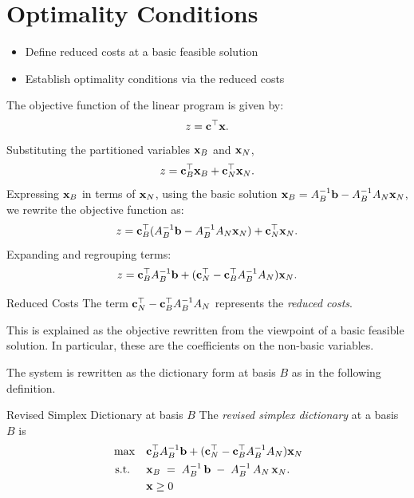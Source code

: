 \section{Optimality Conditions}
\label{sec:optimality-conditions}
\begin{outcome}
\begin{itemize}
\item Define reduced costs at a basic feasible solution
\item Establish optimality conditions via the reduced costs
\end{itemize}
\end{outcome}
The objective function of the linear program is given by:
    \[
    z = \mathbf{c}^\top \mathbf{x}.
    \]
    Substituting the partitioned variables \( \mathbf{x}_B \) and \( \mathbf{x}_N \),
    \[
    z =\mathbf{c}_B^\top \mathbf{x}_B +\mathbf{c}_N^\top \mathbf{x}_N.
    \]
    Expressing \( \mathbf{x}_B \) in terms of \( \mathbf{x}_N \), using the basic solution \( \mathbf{x}_B = A_B^{-1}\mathbf{b}- A_B^{-1} A_N \mathbf{x}_N \), we rewrite the objective function as:
    \begin{equation}
    z =\mathbf{c}_B^\top (A_B^{-1}\mathbf{b}- A_B^{-1} A_N \mathbf{x}_N) +\mathbf{c}_N^\top \mathbf{x}_N.
    \end{equation}
    Expanding and regrouping terms:
    \begin{equation}
    z =\mathbf{c}_B^\top A_B^{-1}\mathbf{b}+  (\mathbf{c}_N^\top -\mathbf{c}_B^\top A_B^{-1} A_N )\mathbf{x}_N.
    \end{equation}
    \begin{definition}{Reduced Costs}{}
    The term \(\mathbf{c}_N^\top -\mathbf{c}_B^\top A_B^{-1} A_N \) represents the \emph{reduced costs}.  
    
    This is explained as the objective rewritten from the viewpoint of a basic feasible solution. In particular, these are the coefficients on the non-basic variables.
\end{definition}
    

The system is rewritten as the dictionary form at basis $B$ as in the following definition.

\begin{definition}{Revised Simplex Dictionary at basis $B$}{}
The \emph{revised simplex dictionary} at a basis $B$ is 
\begin{equation}
\label{eq:dictionary-general}
\begin{aligned}
\max \quad & \mathbf{c}_B^\top A_B^{-1}\mathbf{b} + (\mathbf{c}_N^\top -  \mathbf{c}_B^\top A_B^{-1}A_N)\mathbf{x}_N\\
\mbox{ s.t. } \quad & 
 \mathbf{x}_B 
\;=\;
A_B^{-1}\,\mathbf{b}
\;-\;
A_B^{-1} \,A_N\,\mathbf{x}_N.\\
& \mathbf{x} \geq 0
\end{aligned}
\end{equation}
\end{definition}

